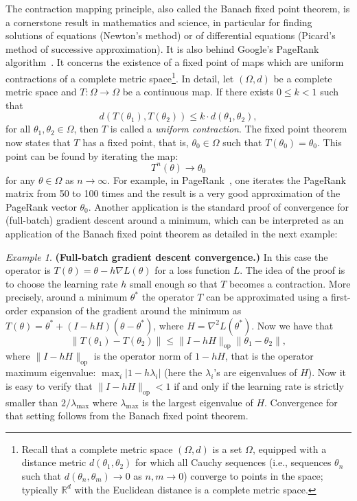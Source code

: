 \documentclass[10pt]{article} %
\theoremstyle{plain}
\theoremstyle{definition}
\theoremstyle{remark}
\newtheorem{example}[theorem]{Example}
\begin{document}
The contraction mapping principle, also called the Banach fixed point theorem, is a cornerstone result in mathematics and science, in particular for finding solutions of equations (Newton's method) or of differential equations (Picard's method of successive approximation).
It is also behind Google's PageRank algorithm~\cite{PageBrin98}.
It concerns the existence of a fixed point of maps which
are uniform contractions of a complete metric space\footnote{Recall that a complete metric space $(\Omega, d)$ is a set $\Omega$, equipped with a distance metric $d(\theta_1,\theta_2)$ for which all Cauchy sequences (i.e., sequences $\theta_n$ such that $d(\theta_n, \theta_m) \rightarrow 0$ as $n,m\rightarrow 0$) converge to points in the space; typically $\mathbb R^d$ with the Euclidean distance is a complete metric space.}. In detail, let
$(\Omega,d)$ be a complete metric space and $T:\Omega\rightarrow \Omega$ be a continuous map. If there exists $0\leq k<1$ such that
\[
    d(T(\theta_1),T(\theta_2))\leq k\cdot d(\theta_1,\theta_2),
\]
for all $\theta_1,\theta_2\in \Omega$, then $T$ is called a \emph{uniform contraction}. The fixed point theorem now states that $T$ has a fixed
point, that is, $\theta_{0}\in \Omega$ such that $T(\theta_{0})=\theta_0$. This point can be found by iterating the map:
\[
T^{n}(\theta)\rightarrow \theta_{0}
\]
for any $\theta\in \Omega$ as $n\rightarrow\infty$. For example, in PageRank~\cite{PageBrin98}, one iterates the PageRank matrix from 50 to 100 times and the result is a very good approximation of the PageRank vector $\theta_0$.
Another application is the standard proof of convergence for (full-batch) gradient descent around a minimum, which can be interpreted as an application of the Banach fixed point theorem as detailed in the next example:

\begin{example} {\bf (Full-batch gradient descent convergence.)} \label{example:full_batch_convergence}In this case the operator is $T(\theta) = \theta - h\nabla L(\theta)$ for a loss function $L$. The idea of the proof is to choose the learning rate $h$ small enough so that $T$ becomes a contraction. More precisely, around a minimum $\theta^*$ the operator $T$ can be approximated using a first-order expansion of the gradient around the minimum as $T(\theta) = \theta^* + (I - hH)(\theta-\theta^*)$,
where $H=\nabla^2 L(\theta^*)$. Now we have that 
\begin{equation}
    \|T(\theta_1) - T(\theta_2)\| \leq \|I - hH\|_{\textrm{op}} \|\theta_1 - \theta_2\|,
\end{equation}
where $\|I - hH\|_{\textrm{op}}$ is the operator norm of $1 -hH$, that is the operator maximum eigenvalue: $\max_i | 1 - h\lambda_i|$ (here the $\lambda_i$'s are eigenvalues of $H$). Now it is easy to verify that $ \|I - hH\|_{\textrm{op}} < 1$ if and only if the learning rate is strictly smaller than $2/\lambda_{\textrm{max}}$ where $\lambda_{\textrm{max}}$ is the largest eigenvalue of $H$. Convergence for that setting follows from the Banach fixed point theorem. 
\end{example}
\end{document}
